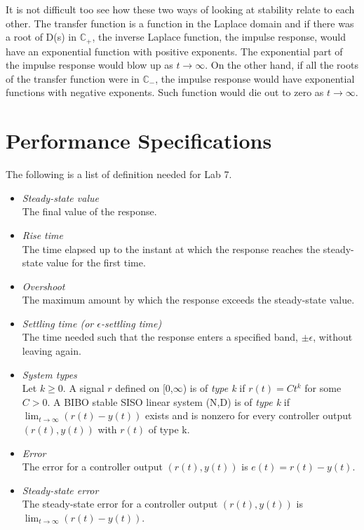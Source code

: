 It is not difficult too see how these two ways of looking at
stability relate to each other.  The transfer function is a
function in the Laplace domain and if there was a root of D(s) in
$\mathbb{C}_{+}$, the inverse Laplace function, the impulse
response, would have an exponential function with positive
exponents.  The exponential part of the impulse response would
blow up as $t\rightarrow\infty$.  On the other hand, if all the
roots of the transfer function were in $\mathbb{C}_{-}$, the
impulse response would have exponential functions with negative
exponents. Such function would die out to zero as
$t\rightarrow\infty$.


\section{Performance Specifications}
The following is a list of definition needed for Lab 7.

\begin{itemize}
\item\emph {Steady-state value}
\\The final value of the response.
\item\emph {Rise time}
\\The time elapsed up to the instant at which the response
reaches the steady-state value for the first time.
\item\emph
{Overshoot}
\\The maximum amount by which the response exceeds the
steady-state value.
\item\emph {Settling time (or
$\epsilon$-settling time)}
\\The time needed such that the response enters a specified band,
$\pm\epsilon$, without leaving again.
\item\emph {System types}
\\Let $k\geq 0$. A signal $r$ defined on [0,$\infty$) is of
\emph{type k} if $r(t)=Ct^{k}$ for some $C>0$.  A BIBO stable SISO
linear system (N,D) is of \emph{type k} if
$\lim_{t\rightarrow\infty}(r(t)-y(t))$ exists and is nonzero for
every controller output $(r(t),y(t))$ with $r(t)$ of type k.
\item\emph {Error}
\\The error for a controller output $(r(t),y(t))$ is
$e(t)=r(t)-y(t)$.
\item\emph {Steady-state error}
\\The steady-state error for a controller output $(r(t),y(t))$ is
$\lim_{t\rightarrow\infty}(r(t)-y(t))$.
\end{itemize}

